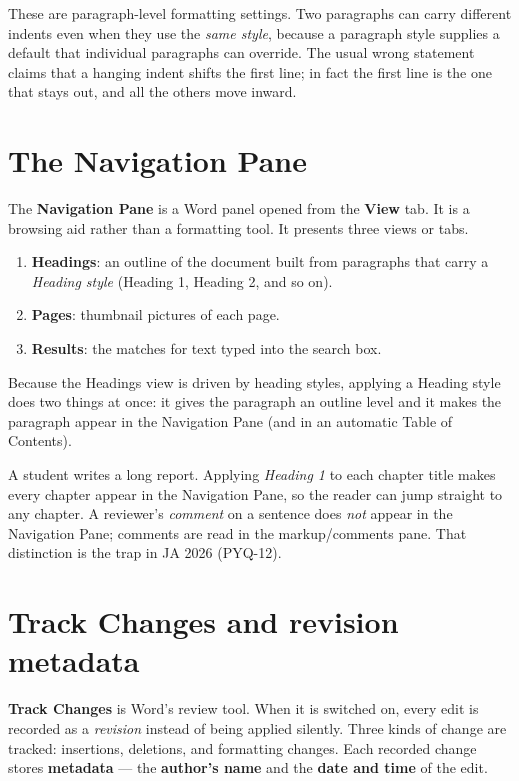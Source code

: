 These are paragraph-level formatting settings. Two paragraphs can carry
different indents even when they use the \emph{same style}, because a
paragraph style supplies a default that individual paragraphs can override.
The usual wrong statement claims that a hanging indent shifts the first line;
in fact the first line is the one that stays out, and all the others move
inward.

\section{The Navigation Pane}
The \textbf{Navigation Pane} is a Word panel opened from the \textbf{View}
tab. It is a browsing aid rather than a formatting tool. It presents three
views or tabs.

\begin{enumerate}
  \item \textbf{Headings}: an outline of the document built from paragraphs
    that carry a \emph{Heading style} (Heading 1, Heading 2, and so on).
  \item \textbf{Pages}: thumbnail pictures of each page.
  \item \textbf{Results}: the matches for text typed into the search box.
\end{enumerate}

Because the Headings view is driven by heading styles, applying a Heading
style does two things at once: it gives the paragraph an outline level and it
makes the paragraph appear in the Navigation Pane (and in an automatic Table
of Contents).

\begin{example}
A student writes a long report. Applying \emph{Heading 1} to each chapter
title makes every chapter appear in the Navigation Pane, so the reader can
jump straight to any chapter. A reviewer's \emph{comment} on a sentence does
\emph{not} appear in the Navigation Pane; comments are read in the
markup/comments pane. That distinction is the trap in JA 2026 (PYQ-12).
\end{example}

\section{Track Changes and revision metadata}
\textbf{Track Changes} is Word's review tool. When it is switched on, every
edit is recorded as a \emph{revision} instead of being applied silently. Three
kinds of change are tracked: insertions, deletions, and formatting changes.
Each recorded change stores \textbf{metadata} --- the \textbf{author's name}
and the \textbf{date and time} of the edit.


